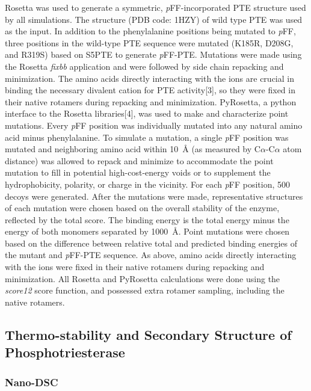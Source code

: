 \begin{refsection}
Rosetta\cite{Leaver-Fay2011,DiMaio2011a} was used to generate a symmetric,
\emph{p}FF-incorporated PTE structure used by all simulations. The structure
(PDB code: 1HZY) of wild type PTE was used as the input. In addition to the
phenylalanine positions being mutated to \emph{p}FF, three positions in the
wild-type PTE sequence were mutated (K185R, D208G, and R319S) based on S5PTE to
generate \emph{p}FF-PTE.\cite{Roodveldt2005} Mutations were made using the
Rosetta \emph{fixbb} application and were followed by side chain repacking and
minimization. The amino acids directly interacting with the  ions
are crucial in binding the necessary divalent cation for PTE activity[3], so
they were fixed in their native rotamers during repacking and minimization.
PyRosetta, a python interface to the Rosetta libraries[4], was used to make and
characterize point mutations. Every \emph{p}FF position was individually
mutated into any natural amino acid minus phenylalanine. To simulate a
mutation, a single \emph{p}FF position was mutated and neighboring amino acid
within \SI{10}{\angstrom} (as measured by C$\alpha$-C$\alpha$ atom distance) was
allowed to repack and minimize to accommodate the point mutation to fill in
potential high-cost-energy voids or to supplement the hydrophobicity, polarity,
or charge in the vicinity. For each \emph{p}FF position, 500 decoys were
generated. After the mutations were made, representative structures of each
mutation were chosen based on the overall stability of the enzyme, reflected by
the total score. The binding energy is the total energy minus the energy of
both monomers separated by \SI{1000}{\angstrom}. Point mutations were chosen based on
the difference between relative total and predicted binding energies of the
mutant and \emph{p}FF-PTE sequence. As above, amino acids directly interacting
with the  ions were fixed in their native rotamers during repacking
and minimization. All Rosetta and PyRosetta calculations were done using the
\emph{score12} score function, and possessed extra rotamer sampling, including
the native rotamers.

\subsection{Thermo-stability and Secondary Structure of Phosphotriesterase}
\label{sec:thermo}

\subsubsection{Nano-DSC}
\label{sec:dsc-method}


\end{refsection}
